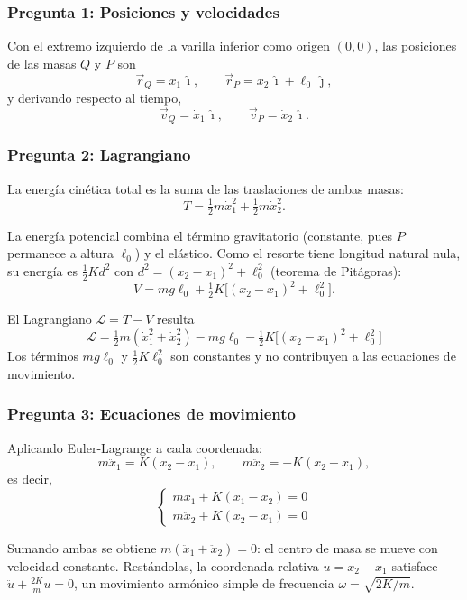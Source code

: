 \begin{sol}

\subsubsection*{Pregunta 1: Posiciones y velocidades}

Con el extremo izquierdo de la varilla inferior como origen $(0,0)$, las posiciones de las
masas $Q$ y $P$ son
$$\vec{r}_Q = x_1\,\hat{\imath},\qquad \vec{r}_P = x_2\,\hat{\imath} + \ell_0\,\hat{\jmath},$$
y derivando respecto al tiempo,
$$\vec{v}_Q = \dot{x}_1\,\hat{\imath},\qquad \vec{v}_P = \dot{x}_2\,\hat{\imath}.$$

\subsubsection*{Pregunta 2: Lagrangiano}

La energía cinética total es la suma de las traslaciones de ambas masas:
$$T = \tfrac12 m\dot{x}_1^2 + \tfrac12 m\dot{x}_2^2.$$

La energía potencial combina el término gravitatorio (constante, pues $P$ permanece a
altura $\ell_0$) y el elástico. Como el resorte tiene longitud natural nula, su energía es
$\tfrac12 K d^2$ con $d^2=(x_2-x_1)^2+\ell_0^2$ (teorema de Pitágoras):
$$V = m g\ell_0 + \tfrac12 K\big[(x_2-x_1)^2 + \ell_0^2\big].$$

El Lagrangiano $\mathcal{L}=T-V$ resulta
$$\boxed{\;\mathcal{L} = \tfrac12 m(\dot{x}_1^2 + \dot{x}_2^2)
- m g\ell_0 - \tfrac12 K\big[(x_2-x_1)^2 + \ell_0^2\big]\;}$$
Los términos $m g\ell_0$ y $\tfrac12 K\ell_0^2$ son constantes y no contribuyen a las
ecuaciones de movimiento.

\subsubsection*{Pregunta 3: Ecuaciones de movimiento}

Aplicando Euler-Lagrange a cada coordenada:
$$m\ddot{x}_1 = K(x_2-x_1),\qquad m\ddot{x}_2 = -K(x_2-x_1),$$
es decir,
$$\boxed{\begin{cases} m\ddot{x}_1 + K(x_1-x_2) = 0 \\[2pt] m\ddot{x}_2 + K(x_2-x_1) = 0\end{cases}}$$

Sumando ambas se obtiene $m(\ddot{x}_1+\ddot{x}_2)=0$: el centro de masa se mueve con
velocidad constante. Restándolas, la coordenada relativa $u=x_2-x_1$ satisface
$\ddot{u} + \tfrac{2K}{m}u = 0$, un movimiento armónico simple de frecuencia
$\omega=\sqrt{2K/m}$.

\end{sol}
